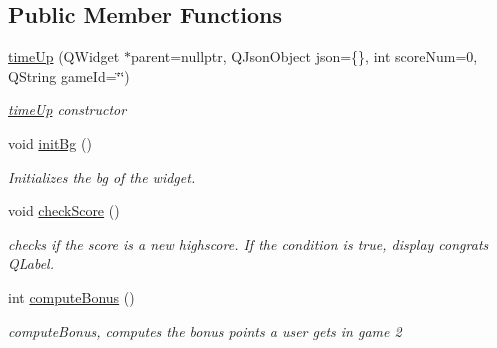 \subsection*{Public Member Functions}
\begin{DoxyCompactItemize}
\item 
\hyperlink{classtimeUp_a462717224a7754296209355928f97ab1}{time\+Up} (Q\+Widget $\ast$parent=nullptr, Q\+Json\+Object json=\{\}, int score\+Num=0, Q\+String game\+Id=\char`\"{}\char`\"{})
\begin{DoxyCompactList}\small\item\em \hyperlink{classtimeUp}{time\+Up} constructor \end{DoxyCompactList}\item 
\mbox{\label{classtimeUp_afed188f978febdadc9c51ca2b510dedf}} 
void \hyperlink{classtimeUp_afed188f978febdadc9c51ca2b510dedf}{init\+Bg} ()
\begin{DoxyCompactList}\small\item\em Initializes the bg of the widget. \end{DoxyCompactList}\item 
\mbox{\label{classtimeUp_a050a9325077406b54bc32c332952327f}} 
void \hyperlink{classtimeUp_a050a9325077406b54bc32c332952327f}{check\+Score} ()
\begin{DoxyCompactList}\small\item\em checks if the score is a new highscore. If the condition is true, display congrats Q\+Label. \end{DoxyCompactList}\item 
int \hyperlink{classtimeUp_ae248b5d925d67ef28cb795147d260a93}{compute\+Bonus} ()
\begin{DoxyCompactList}\small\item\em compute\+Bonus, computes the bonus points a user gets in game 2 \end{DoxyCompactList}\end{DoxyCompactItemize}
